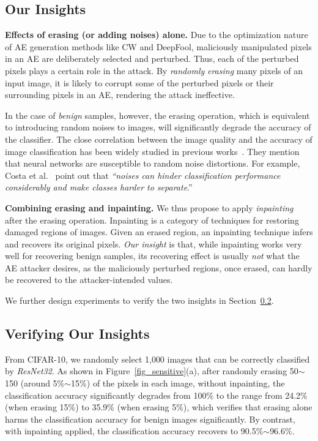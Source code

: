 \documentclass[sigconf]{acmart}
\begin{document}
\subsection{Our Insights}

\noindent \textbf{Effects of erasing (or adding noises) alone.}
Due to the optimization nature of AE generation methods like CW and DeepFool,
maliciously manipulated pixels in an AE are deliberately selected and perturbed.
Thus, each of the perturbed pixels plays a certain role in the attack. 
By \emph{randomly} \emph{erasing} many pixels of an input image, it is likely to
corrupt some of the perturbed pixels or their surrounding pixels 
in an AE, rendering the attack ineffective. 

In the case of \emph{benign} samples, however, the erasing operation, which is equivalent 
to introducing random noises to images, 
will significantly degrade the accuracy of the classifier.
The close correlation between the image quality and the accuracy of image classification 
has been widely studied in previous works~\cite{diamond2017dirty,da2016empirical,dodge2016understanding}. 
They mention that neural networks are
susceptible to random noise distortions. For example,
Costa et al.~\cite{da2016empirical} point out that  
\textit{``noises can hinder classification performance considerably and make classes harder to separate}.''


\vspace{3pt}
\noindent \textbf{Combining erasing and inpainting.} 
We thus propose to apply \emph{inpainting} after the erasing operation.
Inpainting is a category
of techniques for restoring damaged regions of images.
Given an erased region, an inpainting technique  
infers and recovers its original pixels. \emph{Our insight} is that, while inpainting works very well
for recovering benign samples, its recovering effect is usually \emph{not}
what the AE attacker desires, as the maliciously perturbed
regions, once erased, can hardly be recovered to the attacker-intended values. 


We further design experiments to verify the two insights in Section~\ref{sec:verify}. 


\vspace{-2pt}
\subsection{Verifying Our Insights} \label{sec:verify}

From CIFAR-10, we randomly select 1,000 images that can be correctly 
classified by \emph{ResNet32}. 
As shown in Figure~\ref{fig_sensitive}(a), after randomly erasing 50$\sim$150 (around 5\%$\sim$15\%) of the pixels in each image,
without inpainting, the classification accuracy significantly degrades from 100\% to the range from 24.2\% (when erasing 15\%) to 35.9\% (when erasing 5\%), which verifies that erasing alone harms
the classification accuracy for benign images significantly. 
By contrast, with inpainting applied, the classification accuracy recovers to 90.5\%$\sim$96.6\%. 
\end{document}
